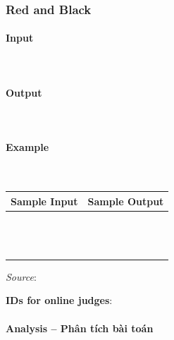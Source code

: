 \documentclass{article}
\begin{document}
\subsubsection{Red and Black}
 

\paragraph{Input} \mbox{} \\



\paragraph{Output}\mbox{} \\


\paragraph{Example}\mbox{} \\

\begin{table}[h]
    \centering
    \begin{tabular}{|l|r|}
        \hline
        \textbf{Sample Input} & \textbf{Sample Output} \\
        \hline
		&  \\ 
		&  \\ 
		&  \\ 
		&  \\ 
		&  \\
		&  \\ 
		&  \\ 
		&  \\ 
		&  \\ 
		&  \\ 
		&  \\ 
		&  \\
		&  \\ \hline
    \end{tabular}
\end{table}

\textit{Source}: 

\textbf{IDs for online judges}:

\paragraph{Analysis -- Phân tích bài toán} \mbox{} \\
\end{document}
